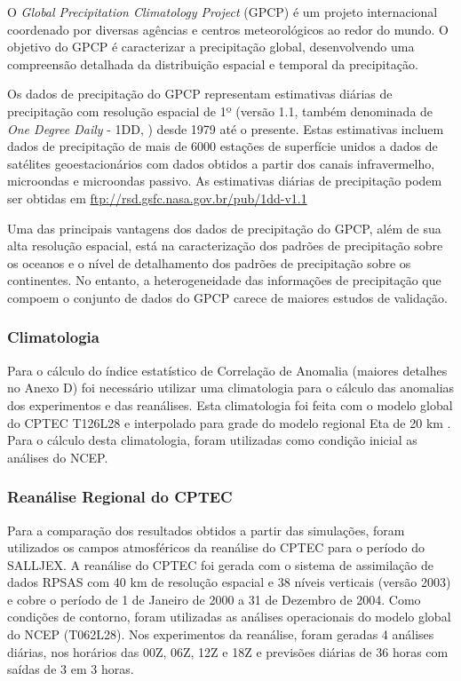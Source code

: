 O \textit{Global Precipitation Climatology Project} (GPCP) \cite{wcrp86} é um projeto internacional coordenado por diversas agências e centros meteorológicos ao redor do mundo. O objetivo do GPCP é caracterizar a precipitação global, desenvolvendo uma compreensão detalhada da distribuição espacial e temporal da precipitação.

Os dados de precipitação do GPCP representam estimativas diárias de precipitação com resolução espacial de 1º (versão 1.1, também denominada de \textit{One Degree Daily} - 1DD, \cite{huffmanetal97}) desde 1979 até o presente. Estas estimativas incluem dados de precipitação de mais de 6000 estações de superfície unidos a dados de satélites geoestacionários com dados obtidos a partir dos canais  infravermelho, microondas e microondas passivo. As estimativas diárias de precipitação podem ser obtidas em \url{ftp://rsd.gsfc.nasa.gov.br/pub/1dd-v1.1}

Uma das principais vantagens dos dados de precipitação do GPCP, além de sua alta resolução espacial, está na caracterização dos padrões de precipitação sobre os oceanos e o nível de detalhamento dos padrões de precipitação sobre os continentes. No entanto, a heterogeneidade das informações de precipitação que compoem o conjunto de dados do GPCP carece de maiores estudos de validação.

\subsubsection{Climatologia}

Para o cálculo do índice estatístico de Correlação de Anomalia (maiores detalhes no Anexo D) foi necessário utilizar uma climatologia para o cálculo das anomalias dos experimentos e das reanálises. Esta climatologia foi feita com o modelo global do CPTEC T126L28 e interpolado para grade do modelo regional Eta de 20 km \cite{sapucci09}. Para o cálculo desta climatologia, foram utilizadas como condição inicial as análises do NCEP.

\subsubsection{Reanálise Regional do CPTEC}
    
Para a comparação dos resultados obtidos a partir das simulações, foram utilizados os campos atmosféricos da reanálise do CPTEC \cite{aravequiaetal07} para o período do SALLJEX. A reanálise do CPTEC foi gerada com o sistema de assimilação de dados RPSAS com 40 km de resolução espacial e 38 níveis verticais (versão 2003) e cobre o período de 1 de Janeiro de 2000 a 31 de Dezembro de 2004. Como condições de contorno, foram utilizadas as análises operacionais do modelo global do NCEP (T062L28). Nos experimentos da reanálise, foram geradas 4 análises diárias, nos horários das 00Z, 06Z, 12Z e 18Z e previsões diárias de 36 horas com saídas de 3 em 3 horas. 

